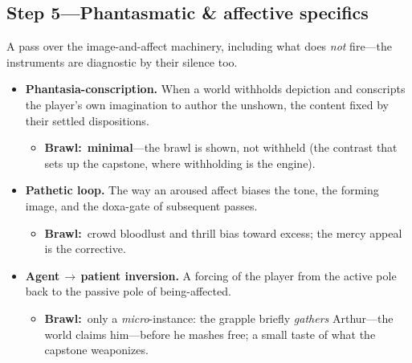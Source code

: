\documentclass[11pt]{article}
\newcommand{\inb}{\textbf{Brawl:}~}
\begin{document}
\subsection*{Step 5---Phantasmatic \& affective specifics}
\noindent A pass over the image-and-affect machinery, including what does \emph{not} fire---the instruments are diagnostic by their silence too.
\begin{itemize}
  \item \textbf{Phantasia-conscription.} When a world withholds depiction and conscripts the player's own imagination to author the unshown, the content fixed by their settled dispositions.
    \begin{itemize}\item \inb \textbf{minimal}---the brawl is shown, not withheld (the contrast that sets up the capstone, where withholding is the engine).\end{itemize}
  \item \textbf{Pathetic loop.} The way an aroused affect biases the tone, the forming image, and the doxa-gate of subsequent passes.
    \begin{itemize}\item \inb crowd bloodlust and thrill bias toward excess; the mercy appeal is the corrective.\end{itemize}
  \item \textbf{Agent\,$\to$\,patient inversion.} A forcing of the player from the active pole back to the passive pole of being-affected.
    \begin{itemize}\item \inb only a \emph{micro}-instance: the grapple briefly \emph{gathers} Arthur---the world claims him---before he mashes free; a small taste of what the capstone weaponizes.\end{itemize}
\end{itemize}
\end{document}
